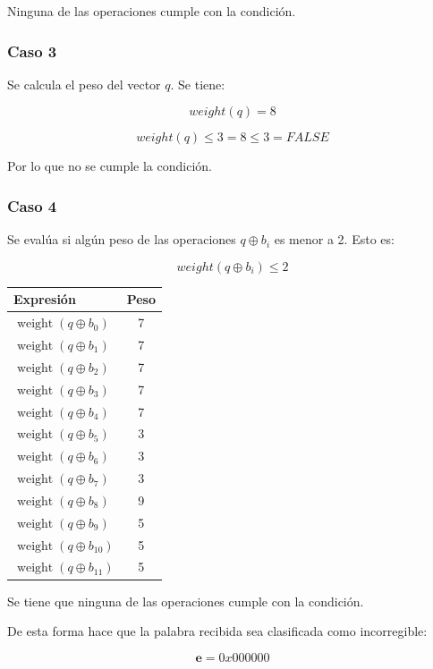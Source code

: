 Ninguna de las operaciones cumple con la condición.

\subsubsection*{Caso 3}

Se calcula el peso del vector $q$. Se tiene:

$$ weight(q) = 8 $$

$$ weight(q) \leq 3 = 8 \leq 3 = FALSE $$

Por lo que no se cumple la condición.

\subsubsection*{Caso 4}

Se evalúa si algún peso de las operaciones $q \oplus b_{i}$ es menor a 2. Esto es:

$$ weight(q \oplus b_{i}) \leq 2 $$

\begin{table}[H]
    \centering
    \begin{tabular}{lc}
        \hline
        \textbf{Expresión} & \textbf{Peso} \\
        \hline
        $\operatorname{weight}(q \oplus b_0)$    & 7 \\
        $\operatorname{weight}(q \oplus b_1)$    & 7 \\
        $\operatorname{weight}(q \oplus b_2)$    & 7 \\
        $\operatorname{weight}(q \oplus b_3)$    & 7 \\
        $\operatorname{weight}(q \oplus b_4)$    & 7 \\
        $\operatorname{weight}(q \oplus b_5)$    & 3 \\
        $\operatorname{weight}(q \oplus b_6)$    & 3 \\
        $\operatorname{weight}(q \oplus b_7)$    & 3 \\
        $\operatorname{weight}(q \oplus b_8)$    & 9 \\
        $\operatorname{weight}(q \oplus b_9)$    & 5 \\
        $\operatorname{weight}(q \oplus b_{10})$ & 5 \\
        $\operatorname{weight}(q \oplus b_{11})$ & 5 \\
        \hline
    \end{tabular}
\end{table}

Se tiene que ninguna de las operaciones cumple con la condición.

De esta forma hace que la palabra recibida sea clasificada como incorregible:

$$ \boxed{\textbf{e} = 0x000000} $$